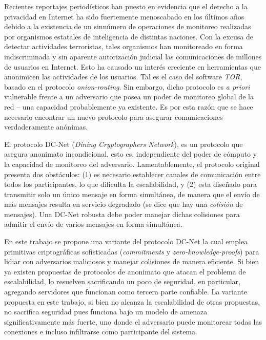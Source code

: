 \hspace{\parindent} Recientes reportajes periodísticos han puesto en evidencia que el derecho a la 
privacidad en Internet ha sido fuertemente menoscabado en los últimos años 
debido a la existencia de un sinnúmero de operaciones de monitoreo realizadas 
por organismos estatales de inteligencia de distintas naciones.
Con la excusa de detectar actividades terroristas, tales organismos han 
monitoreado en forma indiscriminada y sin aparente autorización judicial las 
comunicaciones de millones de usuarios en Internet. Esto ha causado un interés 
creciente en herramientas que anonimicen las actividades de los usuarios. 
Tal es el caso del software \emph{TOR}, basado en el protocolo 
\emph{onion-routing}. Sin embargo, dicho protocolo es \emph{a priori} 
vulnerable frente a un adversario que posea un poder de monitoreo global de la 
red -- una capacidad probablemente ya existente. Es por esta razón que se hace 
necesario encontrar un nuevo protocolo para asegurar comunicaciones 
verdaderamente anónimas.

El protocolo DC-Net (\emph{Dining Cryptographers Network}), es un protocolo 
que asegura anonimato incondicional, esto es, independiente del poder de 
cómputo y la capacidad de monitoreo del adversario. Lamentablemente, el 
protocolo original presenta dos obstáculos: (1) es necesario establecer 
canales de comunicación entre todos los participantes, lo que dificulta la 
escalabilidad, y (2) esta diseñado para transmitir solo un único mensaje en 
forma simultánea, de manera que el envío de más mensajes resulta en servicio 
degradado (se dice que hay una \emph{colisión} de mensajes). Una DC-Net 
robusta debe poder manejar dichas colisiones para admitir el envío de varios 
mensajes en forma simultánea.

En este trabajo se propone una variante del protocolo DC-Net la cual emplea 
primitivas criptográficas sofisticadas (\emph{commitments} y 
\emph{zero-knowledge-proofs}) para lidiar con adversarios maliciosos y manejar 
colisiones de manera eficiente. Si bien ya existen propuestas de protocolos de 
anonimato que atacan el problema de escalabilidad, lo resuelven sacrificando 
un poco de seguridad, en particular, agregando servidores que funcionan como 
tercera parte confiable. La variante propuesta en este trabajo, si bien no 
alcanza la escalabilidad de otras propuestas, no sacrifica seguridad pues 
funciona bajo un modelo de amenaza significativamente más fuerte, uno donde el 
adversario puede monitorear todas las conexiones e incluso infiltrarse como 
participante del sistema.

